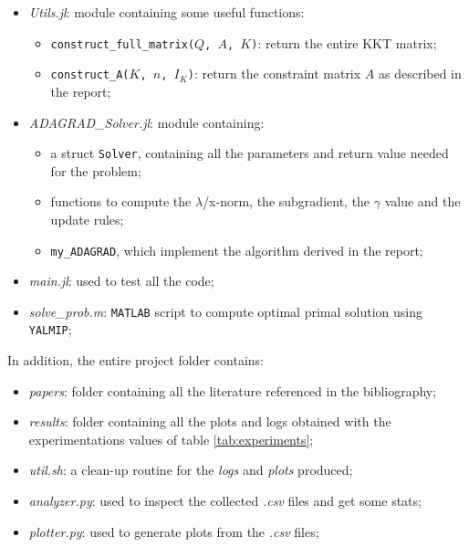 \documentclass[notitlepage]{article}
\begin{document}
\begin{itemize}
  \item \textit{Utils.jl}: module containing some useful functions:
  \begin{itemize}
    \item \texttt{construct\_full\_matrix($Q$, $A$, $K$)}: return the entire KKT matrix;
    \item \texttt{construct\_A($K$, $n$, $I_K$)}: return the constraint matrix $A$ as described in the report;
  \end{itemize}
  \item \textit{ADAGRAD\_Solver.jl}: module containing:
  \begin{itemize}
    \item a struct \texttt{Solver}, containing all the parameters and return value needed for the problem;
    \item functions to compute the $\lambda$/x-norm, the subgradient, the $\gamma$ value and the update rules;
    \item \texttt{my\_ADAGRAD}, which implement the algorithm derived in the report;
  \end{itemize}
  \item \textit{main.jl}: used to test all the code;
  \item \textit{solve\_prob.m}: \texttt{MATLAB} script to compute optimal primal solution using \texttt{YALMIP};
\end{itemize}
In addition, the entire project folder contains:
\begin{itemize}
  \item \textit{papers}: folder containing all the literature referenced in the bibliography;
  \item \textit{results}: folder containing all the plots and logs obtained with the experimentations values of table \ref{tab:experiments};
  \item \textit{util.sh}: a clean-up routine for the \textit{logs} and \textit{plots} produced;
  \item \textit{analyzer.py}: used to inspect the collected \textit{.csv} files and get some stats;
  \item \textit{plotter.py}: used to generate plots from the \textit{.csv} files;
\end{itemize}
\end{document}
